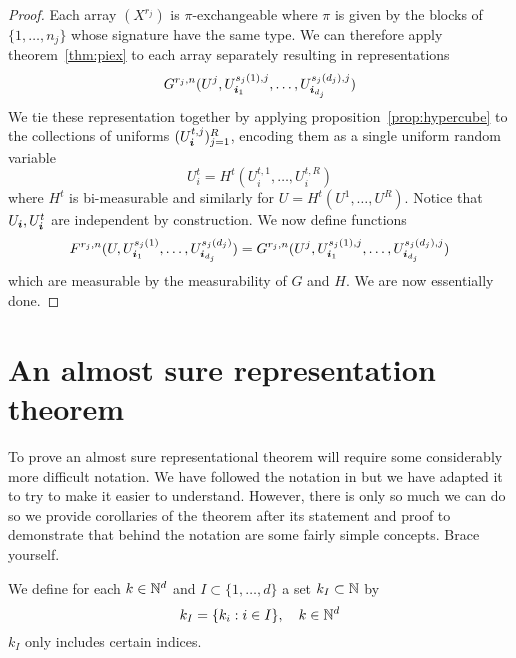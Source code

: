 \begin{proof}
  Each array $(X^{r_j})$ is $\pi$-exchangeable where $\pi$ is given by the blocks of $\{1,\dots,n_j\}$ whose signature have the same type.
  We can therefore apply theorem~\ref{thm:piex} to each array separately resulting in representations
\begin{equation}
  G^{r_j,n}(U^j,U^{s_{j}(1),j}_{\bm{i}_1},\dots,U^{s_{j}(d_j),j}_{\bm{i}_{d_j}})
\end{equation}
We tie these representation together by applying proposition~\ref{prop:hypercube} to the collections of uniforms $(U^{t,j}_{\bm{i}})_{j=1}^R$, encoding them as a single uniform random variable
\begin{equation}
  U^t_{i} = H^t(U^{t,1}_{i},\dots,U^{t,R}_{i})
\end{equation}
where $H^t$ is bi-measurable and similarly for $U = H^t(U^{1},\dots,U^{R})$.
Notice that $U_{\bm{i}}, U^t_{\bm{i}}$ are independent by construction.
We now define functions
\begin{equation}
F^{r_j,n}(U,U^{s_{j}(1)}_{\bm{i}_1},\dots,U^{s_{j}(d_j)}_{\bm{i}_{d_j}}) = G^{r_j,n}(U^j,U^{s_{j}(1),j}_{\bm{i}_1},\dots,U^{s_{j}(d_j),j}_{\bm{i}_{d_j}})
\end{equation}
which are measurable by the measurability of $G$ and $H$.
We are now essentially done.
\end{proof}

\begin{rem}
\label{rem:randfunc}
\end{rem}

\section{An almost sure representation theorem}
\label{sec:almost_sure}

To prove an almost sure representational theorem will require some considerably more difficult notation.
We have followed the notation in  but we have adapted it to try to make it easier to understand.
However, there is only so much we can do so we provide corollaries of the theorem after its statement and proof to demonstrate that behind the notation are some fairly simple concepts.
Brace yourself.

We define for each $k \in \mathbb{N}^d$ and $I \subset \{1,\ldots,d\}$ a set $k_I \subset \mathbb{N}$ by
\begin{equation}
k_I = \{k_i: i \in I\}, \quad k \in \mathbb{N}^d
\end{equation}
\ie $k_I$ only includes certain indices.

